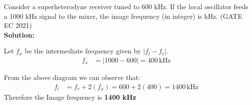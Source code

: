 \documentclass{article}
\begin{document}
Consider a superheterodyne receiver tuned to 600 kHz. If the local oscillator feeds a 1000 kHz signal to the mixer, the image frequency (in integer) is \underline{\hspace{1cm}} kHz.
\hfill(GATE EC 2021)\\

\textbf{Solution:}

Let \(f_x\) be the intermediate frequency given by \(|f_l - f_r|\).
\begin{align}
    f_x &= |1000-600| = 400 \, \text{kHz}
\end{align}


From the above diagram we can observe that:
\begin{align}
    f_i &= f_r+2(f_x) = 600+2(400)=1400 \, \text{kHz}
\end{align}
Therefore the Image frequency is \textbf{1400 kHz}
\end{document}
